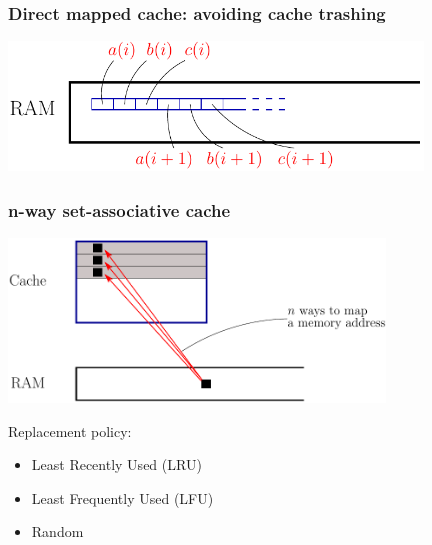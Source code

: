 \documentclass{beamer}
\begin{document}
\begin{frame}\frametitle{Direct mapped cache: avoiding cache trashing}
\begin{center}
  \includegraphics[width=11cm]{../../notes/01.single/AdjacentMemory}
\end{center}
\end{frame}

\begin{frame}\frametitle{n-way set-associative cache}
\begin{center}
  \includegraphics[width=10cm]{../../notes/01.single/NWayCache}
\end{center}
\vspace{.5cm}
Replacement policy: 
\begin{itemize}
  \item Least Recently Used (LRU)
  \item Least Frequently Used (LFU)
  \item Random
\end{itemize}
\end{frame}
\end{document}
